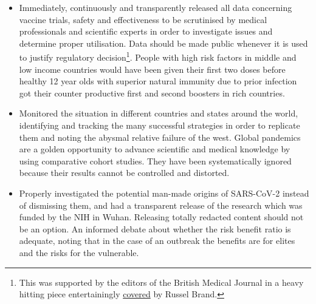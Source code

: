 \documentclass[11pt,a4paper,notitlepage]{report}
\begin{document}
\begin{itemize}
  \item Immediately, continuously and transparently released all data concerning vaccine trials, safety and effectiveness to be scrutinised by medical professionals and scientific experts in order to investigate issues and determine proper utilisation. Data should be made public whenever it is used to justify regulatory decision\footnote{This was supported by the editors of the British Medical Journal \cite{bmj19012022} in a heavy hitting piece entertainingly \href{https://www.youtube.com/watch?v=sqD_JYAs7pU}{covered} by Russel Brand.}. People with high risk factors in middle and low income countries would have been given their first two doses before healthy 12 year olds with superior natural immunity due to prior infection got their counter productive first and second boosters in rich countries.
  \item Monitored the situation in different countries and states around the world, identifying and tracking the many successful strategies in order to replicate them and noting the abysmal relative failure of the west. Global pandemics are a golden opportunity to advance scientific and medical knowledge by using comparative cohort studies. They have been systematically ignored because their results cannot be controlled and distorted.
  \item Properly investigated the potential man-made origins of SARS-CoV-2 instead of dismissing them, and had a transparent release of the research which was funded by the NIH in Wuhan. Releasing totally redacted content should not be an option. An informed debate about whether the risk benefit ratio is adequate, noting that in the case of an outbreak the benefits are for elites and the risks for the vulnerable. 
\end{itemize}

\end{document}
